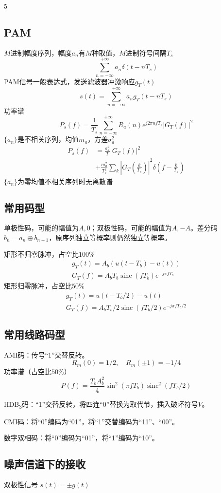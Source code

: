 \documentclass[8pt, a4paper]{extarticle}
\DeclareMathOperator{\sinc}{sinc}
\begin{document}
\begin{multicols}{5}
\subsection{PAM}
\(M\)进制幅度序列，幅度\(a_n\)有\(M\)种取值，\(M\)进制符号间隔\(T_s\)
\[
\sum_{n=-\infty}^{+\infty}a_n \delta(t-nT_s)
\]
PAM信号一般表达式，发送滤波器冲激响应\(g_T(t)\)
\[
s(t)=\sum_{n=-\infty}^{+\infty}a_n g_T(t-nT_s)
\]
功率谱
\[
P_s(f)=\frac{1}{T_s}\sum_{n=-\infty}^{+\infty}R_a(n)e^{j2\pi nfT_s}|G_T(f)|^2
\]
\(\{a_n\}\)是不相关序列，均值\(m_a\)，方差\(\sigma_a^2\)
\[
\begin{aligned}
P_s(f)&=\frac{\sigma_a^2}{T}|G_T(f)|^2\\
&+\frac{m_a^2}{T_s^2}\sum_{k}\left|G_T\left(\frac{k}{T_s}\right)\right|^2\delta\left(f-\frac{k}{T_s}\right)
\end{aligned}
\]
\(\{a_n\}\)为零均值不相关序列时无离散谱
\subsection{常用码型}
单极性码，可能的幅值为\(A,0\)；双极性码，可能的幅值为\(A,-A\)。差分码\(b_n=a_n\oplus b_{n-1}\)，原序列独立等概率则仍然独立等概率。

矩形不归零脉冲，占空比\(100\%\)
\[
\begin{gathered}
g_T(t)=A_b(u(t-T_b)-u(t))\\
G_T(f)=A_b T_b\sinc(fT_b) e^{-j\pi fT_b}
\end{gathered}
\]
矩形归零脉冲，占空比\(50\%\)
\[
\begin{gathered}
g_T(t)=u(t-T_b/2)-u(t)\\
G_T(f)=A_b T_b/2\sinc(fT_b/2) e^{-j\pi fT_b/2}
\end{gathered}
\]
\subsection{常用线路码型}
AMI码：传号“1”交替反转。
\[
R_m(0)=1/2,\quad R_m(\pm 1) = -1/4
\]
功率谱（占空比\(50\%\)）
\[
P(f)=\frac{T_b A_b^2}{4}\sin^2(\pi fT_b)\sinc^2(fT_b/2)
\]

HDB\textsubscript{3}码：“1”交替反转，将四连“0”替换为取代节，插入破坏符号\(V\)。

CMI码：将“0”编码为“01”，将“1”交替编码为“11”、“00”。

数字双相码：将“0”编码为“01”，将“1”编码为“10”。
\subsection{噪声信道下的接收}
双极性信号
\(
s(t)=\pm g(t)
\)


\end{multicols}
\end{document}
